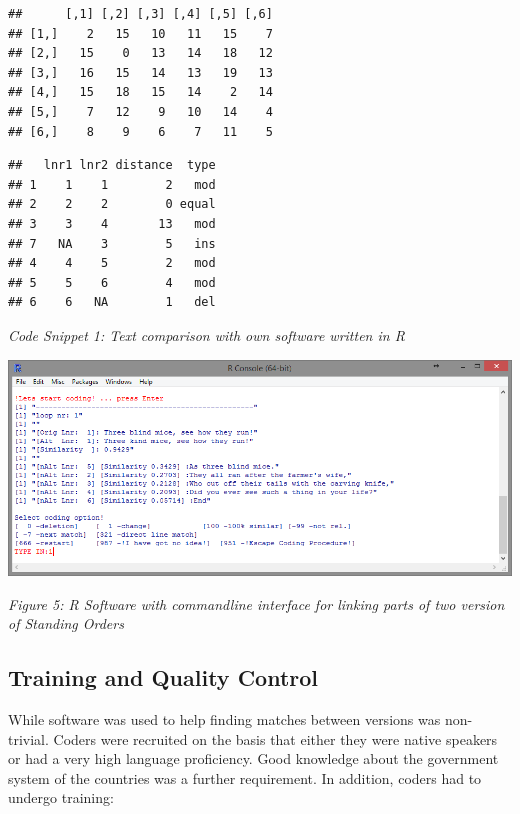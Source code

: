 \documentclass[10pt,]{article}
\newenvironment{Shaded}{\begin{snugshade}}{\end{snugshade}}
\newcommand{\CommentTok}[1]{\textcolor[rgb]{0.56,0.35,0.01}{\textit{{#1}}}}
\newcommand{\NormalTok}[1]{{#1}}
\begin{document}
\begin{verbatim}
##      [,1] [,2] [,3] [,4] [,5] [,6]
## [1,]    2   15   10   11   15    7
## [2,]   15    0   13   14   18   12
## [3,]   16   15   14   13   19   13
## [4,]   15   18   15   14    2   14
## [5,]    7   12    9   10   14    4
## [6,]    8    9    6    7   11    5
\end{verbatim}

\begin{Shaded}
\end{Shaded}

\begin{verbatim}
##   lnr1 lnr2 distance  type
## 1    1    1        2   mod
## 2    2    2        0 equal
## 3    3    4       13   mod
## 7   NA    3        5   ins
## 4    4    5        2   mod
## 5    5    6        4   mod
## 6    6   NA        1   del
\end{verbatim}

\emph{Code Snippet 1: Text comparison with own software written in R}

\begin{center}
\includegraphics[width=\textwidth]{fig/linkage.png}
\end{center}

\emph{Figure 5: R Software with commandline interface for linking parts
of two version of Standing Orders}

\subsection{Training and Quality
Control}\label{training-and-quality-control}

While software was used to help finding matches between versions was
non-trivial. Coders were recruited on the basis that either they were
native speakers or had a very high language proficiency. Good knowledge
about the government system of the countries was a further requirement.
In addition, coders had to undergo training:
\end{document}
